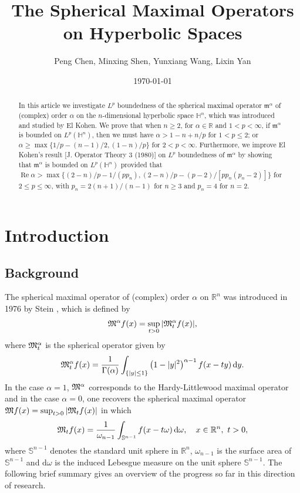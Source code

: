 \documentclass[11pt]{amsproc}
\title{The Spherical Maximal Operators  on Hyperbolic Spaces }
\author[P. Chen, M. Shen, Y. Wang, L. Yan]{Peng Chen, Minxing Shen, Yunxiang Wang, Lixin Yan}
\date{\today}
\newcommand{\R}{\mathbb{R}}
\newcommand{\0}{\mathbf{0}}
\renewcommand{\SS}{\mathbb{S}}
\renewcommand{\d}{\mathrm{d}}
\numberwithin{equation}{section}
\numberwithin{figure}{section}
\theoremstyle{definition}
\theoremstyle{remark}
\numberwithin{thm}{section}
\begin{document}
\begin{abstract}
In this article we investigate $L^p$ boundedness of  the spherical maximal operator $\mathfrak{m}^\alpha$ of (complex) order $\alpha$ on the $n$-dimensional hyperbolic space $\mathbb{H}^n$, which was introduced and studied by El Kohen. We prove that when $n\geq 2$, for $\alpha\in\mathbb{R}$ and $1<p<\infty$, if $\mathfrak{m}^\alpha$ is bounded on $L^p(\mathbb{H}^n)$, then we must have $\alpha>1-n+n/p$ for $1<p\leq 2$; or $\alpha\geq \max\{1/p-(n-1)/2,(1-n)/p\}$ for $2<p<\infty$. Furthermore, we improve El Kohen's result [J. Operator Theory 3 (1980)] on $L^p$ boundedness of $\mathfrak{m}^\alpha$ by showing that $\mathfrak{m}^\alpha$ is bounded on $L^p(\mathbb{H}^n)$ provided that
$\mathop{\mathrm{Re}}\alpha> \max \{{(2-n)/p}-{1/(p p_n)},{(2-n)/p}- (p-2)/[p p_n(p_n-2)]\}
$ for $2\leq p\leq \infty$, with $p_n=2(n+1)/(n-1)$ for $n\geq 3$ and $p_n=4$ for $n=2$.
\end{abstract}
\maketitle




\section{Introduction}\label{sec:1}
\setcounter{equation}{0}

\subsection{Background}
The spherical maximal operator of (complex) order $\alpha$ on ${\mathbb R^n}$ was introduced in 1976 by Stein \cite{St2},  which is defined by
\begin{eqnarray}\label{e1.1}
{\frak M}^\alpha f(x)= \sup_{t>0}
|{\frak M}^\alpha_tf (x) |,
\end{eqnarray}
where ${\frak M}^\alpha_t$ is the spherical operator given by
\begin{eqnarray}\label{e1.2}
{\frak M}^\alpha_t f (x) =
{1\over   \Gamma(\alpha)  }  \int_{\{|y|\leq 1\}} \left(1-{|y|^2 }\right)^{\alpha -1} f(x-ty)\,\d y.
\end{eqnarray}
In the  case $\alpha=1$,  ${\frak M}^\alpha$ corresponds to the Hardy-Littlewood maximal operator and in the case  $\alpha=0$, one  recovers the spherical maximal operator  ${\frak M}  f(x)= \sup_{t>0}
|{\frak M}_tf (x) |$ in which
\begin{eqnarray}\label{e1.3}
{\frak M}_tf (x) = {1\over\omega_{n-1}} \int_{{\mathbb S}^{n-1}}   f(x-t\omega) \,\text{d}\omega, \ \ \ x\in   \R^n,\ t>0,
\end{eqnarray}
where ${\mathbb S}^{n-1}$ denotes the standard unit sphere in ${\mathbb R^n}$, $\omega_{n-1}$ is the surface area of $\SS^{n-1}$ and $\text{d}\omega$ is the induced Lebesgue measure on the unit sphere ${\mathbb S}^{n-1}.$ The following brief summary gives an overview of the progress
so far in this direction of research.
\end{document}
